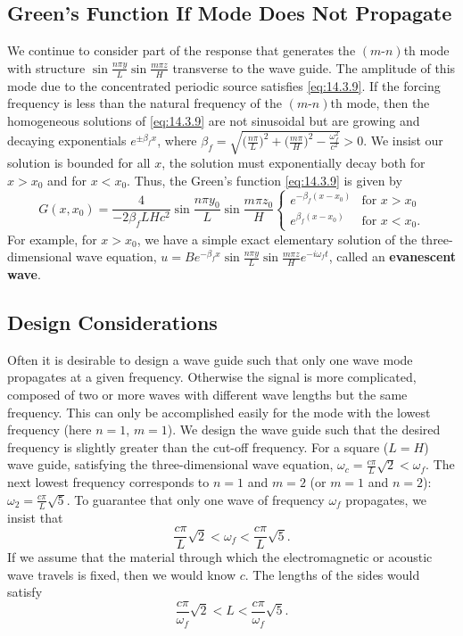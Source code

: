\subsection{Green's Function If Mode Does Not Propagate}
\label{sec:greens-function-no-propagate}

We continue to consider part of the response that generates the $(m\text{-}n)$th mode with structure $\sin\frac{n\pi y}{L}\sin\frac{m\pi z}{H}$ transverse to the wave guide.  The amplitude of this mode due to the concentrated periodic source satisfies \eqref{eq:14.3.9}.  If the forcing frequency is less than the natural frequency of the $(m\text{-}n)$th mode, then the homogeneous solutions of \eqref{eq:14.3.9} are not sinusoidal but are growing and decaying exponentials $e^{\pm\beta_f x}$, where $\beta_f = \sqrt{\bigl(\frac{n\pi}{L}\bigr)^2 + \bigl(\frac{m\pi}{H}\bigr)^2 - \frac{\omega_f^2}{c^2}} > 0$.  We insist our solution is bounded for all $x$, the solution must exponentially decay both for $x > x_0$ and for $x < x_0$.  Thus, the Green's function \eqref{eq:14.3.9} is given by
\begin{equation}
\label{eq:14.3.11}
G(x,x_0) = \frac{4}{-2\beta_fLHc^2}\sin\frac{n\pi y_0}{L}\sin\frac{m\pi z_0}{H}\begin{cases} e^{-\beta_f(x-x_0)} & \text{for } x > x_0 \\ e^{\beta_f(x-x_0)} & \text{for } x < x_0. \end{cases}
\end{equation}
For example, for $x > x_0$, we have a simple exact elementary solution of the three-dimensional wave equation, $u = Be^{-\beta_f x}\sin\frac{n\pi y}{L}\sin\frac{m\pi z}{H}e^{-i\omega_f t}$, called an \textbf{evanescent wave}.

\subsection{Design Considerations}
\label{sec:wave-guide-design}

Often it is desirable to design a wave guide such that only one wave mode propagates at a given frequency.  Otherwise the signal is more complicated, composed of two or more waves with different wave lengths but the same frequency.  This can only be accomplished easily for the mode with the lowest frequency (here $n = 1$, $m = 1$).  We design the wave guide such that the desired frequency is slightly greater than the cut-off frequency.  For a square ($L = H$) wave guide, satisfying the three-dimensional wave equation, $\omega_c = \frac{c\pi}{L}\sqrt{2} < \omega_f$.  The next lowest frequency corresponds to $n = 1$ and $m = 2$ (or $m = 1$ and $n = 2$): $\omega_2 = \frac{c\pi}{L}\sqrt{5}$.  To guarantee that only one wave of frequency $\omega_f$ propagates, we insist that
\[
\frac{c\pi}{L}\sqrt{2} < \omega_f < \frac{c\pi}{L}\sqrt{5}.
\]
If we assume that the material through which the electromagnetic or acoustic wave travels is fixed, then we would know $c$.  The lengths of the sides would satisfy
\[
\frac{c\pi}{\omega_f}\sqrt{2} < L < \frac{c\pi}{\omega_f}\sqrt{5}.
\]

